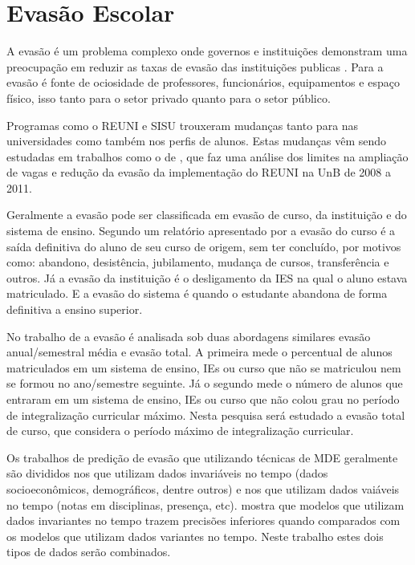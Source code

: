 \documentclass[diss,capa]{texufpel}
\begin{document}
\section{Evasão Escolar}

A evasão é um problema complexo onde governos e instituições demonstram uma preocupação em reduzir as taxas de evasão das instituições publicas \cite{Manhaes2011}. Para \citet{silva2007evasao} a evasão é fonte de ociosidade de professores, funcionários, equipamentos e espaço físico, isso tanto para o setor privado quanto para o setor público.

Programas como o REUNI e SISU trouxeram mudanças tanto para nas universidades como também nos perfis de alunos. Estas mudanças vêm sendo estudadas em trabalhos como o de \citet{brito2013reuni}, que faz uma análise dos limites na ampliação de vagas e redução da evasão da implementação do REUNI na UnB de 2008 a 2011.

Geralmente a evasão pode ser classificada em evasão de curso, da instituição e do sistema de ensino. Segundo um relatório apresentado por \citet{andifes1996diplomaccao} a evasão do curso é a saída definitiva do aluno de seu curso de origem, sem ter concluído, por motivos como: abandono, desistência, jubilamento, mudança de cursos, transferência e outros. Já a evasão da instituição é o desligamento da IES na qual o aluno estava matriculado. E a evasão do sistema é quando o estudante abandona de forma definitiva a ensino superior.

No trabalho de \citet{silva2007evasao} a evasão é analisada sob duas abordagens similares evasão anual/semestral média e evasão total.
A primeira mede o percentual de alunos matriculados em um sistema de ensino, IEs ou curso que não se matriculou nem se formou no ano/semestre seguinte.
Já o segundo mede o número de alunos que entraram em um sistema de ensino, IEs ou curso que não colou grau no período de integralização curricular máximo.
Nesta pesquisa será estudado a evasão total de curso, que considera o período máximo de integralização curricular.

Os trabalhos de predição de evasão que utilizando técnicas de MDE geralmente são divididos nos que utilizam dados invariáveis no tempo (dados socioeconômicos, demográficos, dentre outros) e nos que utilizam dados vaiáveis no tempo (notas em disciplinas, presença, etc).
\citet{lykourentzou2009dropout} mostra que modelos que utilizam dados invariantes no tempo trazem precisões inferiores quando comparados com os modelos que utilizam dados variantes no tempo. 
Neste trabalho estes dois tipos de dados serão combinados.
\end{document}
